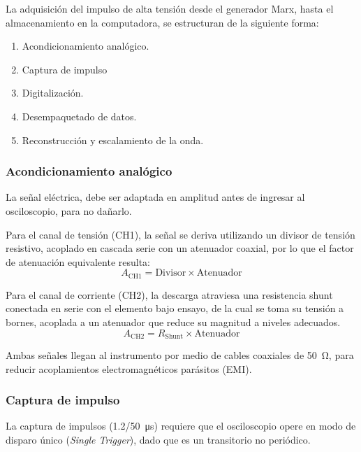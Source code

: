 La adquisición del impulso de alta tensión desde el generador Marx, hasta el almacenamiento en la computadora, se estructuran de la siguiente forma:

\begin{enumerate}
    \item Acondicionamiento analógico.
    \item Captura de impulso
    \item Digitalización.
    \item Desempaquetado de datos.
    \item Reconstrucción y escalamiento de la onda.
\end{enumerate}

\subsubsection{Acondicionamiento analógico}

La señal eléctrica, debe ser adaptada en amplitud antes de ingresar al osciloscopio, para no dañarlo.

Para el canal de tensión (CH1), la señal se deriva utilizando un divisor de tensión resistivo, acoplado en cascada serie con un atenuador coaxial, por lo que el factor de atenuación equivalente resulta:
\begin{equation}
    \label{eq:atenuacion_tension}
    A_{\text{CH1}} = \text{Divisor} \times \text{Atenuador}
\end{equation}

Para el canal de corriente (CH2), la descarga atraviesa una resistencia shunt conectada en serie con el elemento bajo ensayo, de la cual se toma su tensión a bornes, acoplada a un atenuador que reduce su magnitud a niveles adecuados.
\begin{equation}
    \label{eq:atenuacion_corriente}
    A_{\text{CH2}} = R_\text{Shunt} \times \text{Atenuador}
\end{equation}

Ambas señales llegan al instrumento por medio de cables coaxiales de \qty{50}{\ohm}, para reducir acoplamientos electromagnéticos parásitos (EMI).

\subsubsection{Captura de impulso}
\label{subsec:captura_impulso}

La captura de impulsos (\qty[parse-numbers=false]{1.2/50}{\micro\second}) requiere que el osciloscopio opere en modo de disparo único (\emph{Single Trigger}), dado que es un transitorio no periódico.

